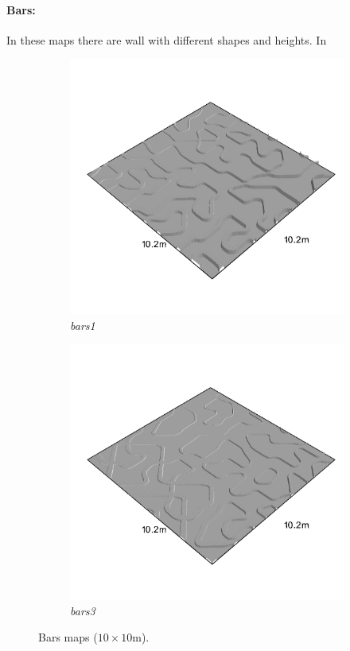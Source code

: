 \documentclass[../document.tex]{subfiles}
\begin{document}
\paragraph{Bars:} In these maps there are wall with different shapes and heights. In 
\begin{figure}[htbp]
    \centering
        \begin{subfigure}[b]{0.32\textwidth}
            \includegraphics[width=\textwidth]{../img/hm3d_borders/bars1.png}
            \caption{\emph{bars1}}
        \end{subfigure}
        \begin{subfigure}[b]{0.32 \linewidth}
            \includegraphics[width=\textwidth]{../img/hm3d_borders/bars3.png}
            \caption{\emph{bars3}}
            \end{subfigure}     
    \caption{Bars maps ($10\times10$m).}
\end{figure}
\end{document}
